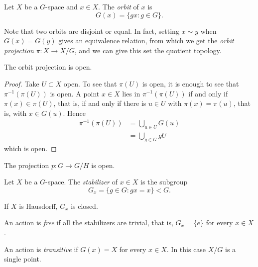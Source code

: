 \begin{definition}
\label{definition-orbit}
Let $X$ be a $G$-space and $x\in X$.
The {\it orbit} of $x$ is
$$
G(x)=\{gx:g\in G\}.
$$
\end{definition}

Note that two orbits are disjoint or
equal. In fact, setting $x\sim y$ when
$G(x)=G(y)$ gives an equivalence
relation, from which we get the
{\it orbit projection}
$\pi:X\to X/G$, and we can give this
set the quotient topology.

\begin{proposition}
\label{proposition-orbit-projection-open}
The orbit projection is open.
\end{proposition}

\begin{proof}
Take $U\subset X$ open. To see that
$\pi(U)$ is open, it is enough to see
that $\pi^{-1}(\pi(U))$ is open. A
point $x\in X$ lies in
$\pi^{-1}(\pi(U))$ if and only if
$\pi(x)\in\pi(U)$, that is, if and only
if there is $u\in U$ with
$\pi(x)=\pi(u)$, that is, with
$x\in G(u)$. Hence
$$
\begin{aligned}
\pi^{-1}\left(\pi(U)\right)
&=\bigcup_{u\in U}G(u) \\
&=\bigcup_{g\in G}gU
\end{aligned}
$$
which is open.
\end{proof}

\begin{corollary}
\label{corollary-coset-projection-open}
The projection $p:G\to G/H$ is open.
\end{corollary}

\begin{definition}
\label{definition-stabilizer}
Let $X$ be a $G$-space. The
{\it stabilizer} of $x\in X$ is the
subgroup
$$
G_x=\{g\in G:gx=x\}<G.
$$
\end{definition}

\begin{proposition}
\label{proposition-stabilizer-closed}
If $X$ is Hausdorff, $G_x$ is closed.
\end{proposition}

\begin{definition}
\label{definition-free-action}
An action is {\it free} if all the
stabilizers are trivial, that is,
$G_x=\{e\}$ for every $x\in X$.
\end{definition}

\begin{definition}
\label{definition-transitive-action}
An action is {\it transitive} if
$G(x)=X$ for every $x\in X$. In this
case $X/G$ is a single point.
\end{definition}

